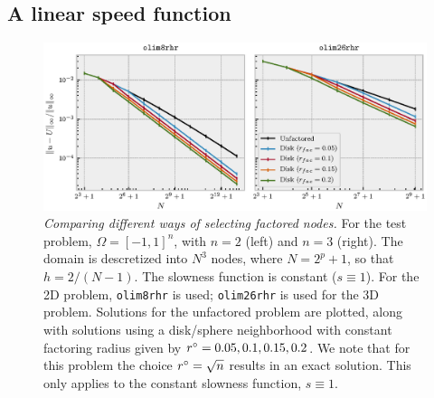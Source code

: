 \documentclass[sisc-eikonal.tex]{subfiles}
\begin{document}
\subsection{A linear speed function}\label{ssec:slotnick}

\begin{figure}
  \centering
  \includegraphics[width=\linewidth]{factoring-error-example.eps}%
  \vspace{-1.4em}
  \caption{\emph{Comparing different ways of selecting factored
      nodes.} For the test problem, $\Omega = [-1, 1]^n$, with $n = 2$
    (left) and $n = 3$ (right). The domain is descretized into $N^3$
    nodes, where $N = 2^p + 1$, so that $h = 2/(N - 1)$. The slowness
    function is constant ($s \equiv 1$). For the 2D problem,
    \texttt{olim8rhr} is used; \texttt{olim26rhr} is used for the 3D
    problem. Solutions for the unfactored problem are plotted, along
    with solutions using a disk/sphere neighborhood with constant
    factoring radius given by $r^\circ = 0.05, 0.1, 0.15, 0.2$. We note
    that for this problem the choice $r^\circ = \sqrt{n}$ results in an
    exact solution. This only applies to the constant slowness
    function, $s \equiv 1$.  }\label{fig:factoring-error-example}
\end{figure}
\end{document}
